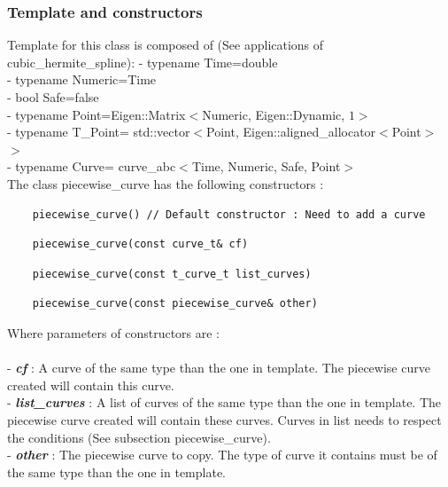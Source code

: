 \documentclass{article}
\begin{document}
    \subsubsection{Template and constructors}
    
    Template for this class is composed of (See applications of cubic\_hermite\_spline):
    - typename Time=double\\
    - typename Numeric=Time\\
    - bool Safe=false\\
    - typename Point=Eigen::Matrix$<$Numeric, Eigen::Dynamic, $1>$\\
    - typename T\_Point= std::vector$<$Point, Eigen::aligned\_allocator$<$Point$>$ $>$\\
    - typename Curve= curve\_abc$<$Time, Numeric, Safe, Point$>$\\
    
    \noindent
    The class piecewise\_curve has the following constructors :
    \begin{lstlisting}
    piecewise_curve() // Default constructor : Need to add a curve
    \end{lstlisting}
    \begin{lstlisting}
    piecewise_curve(const curve_t& cf)
    \end{lstlisting}
    \begin{lstlisting}
    piecewise_curve(const t_curve_t list_curves)
    \end{lstlisting}
    \begin{lstlisting}
    piecewise_curve(const piecewise_curve& other)
    \end{lstlisting}
    
    \noindent
    Where parameters of constructors are :\\\\
    - \textbf{\textit{cf}} : A curve of the same type than the one in template. The piecewise curve created will contain this curve.\\
    - \textbf{\textit{list\_curves}} : A list of curves of the same type than the one in template. The piecewise curve created will contain these curves. Curves in list needs to respect the conditions (See subsection piecewise\_curve).\\
    - \textbf{\textit{other}} : The piecewise curve to copy. The type of curve it contains must be of the same type than the one in template.\\\\
    
\end{document}
